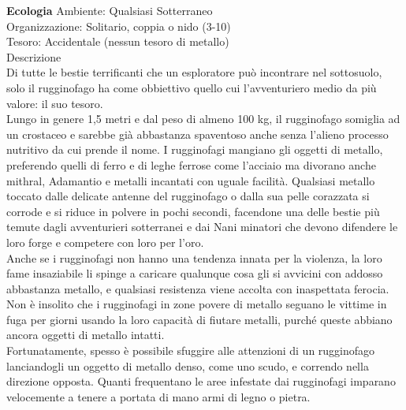 \begin{multicols}{2}
\textbf{Ecologia}
Ambiente: Qualsiasi Sotterraneo\\
Organizzazione: Solitario, coppia o nido (3-10)\\
Tesoro: Accidentale (nessun tesoro di metallo)\\
Descrizione\\
Di tutte le bestie terrificanti che un esploratore può incontrare nel sottosuolo, solo il rugginofago ha come obbiettivo quello cui l'avventuriero medio da più valore: il suo tesoro.\\
Lungo in genere 1,5 metri e dal peso di almeno 100 kg, il rugginofago somiglia ad un crostaceo e sarebbe già abbastanza spaventoso anche senza l'alieno processo nutritivo da cui prende il nome. I rugginofagi mangiano gli oggetti di metallo, preferendo quelli di ferro e di leghe ferrose come l'acciaio ma divorano anche mithral, Adamantio e metalli incantati con uguale facilità. Qualsiasi metallo toccato dalle delicate antenne del rugginofago o dalla sua pelle corazzata si corrode e si riduce in polvere in pochi secondi, facendone una delle bestie più temute dagli avventurieri sotterranei e dai Nani minatori che devono difendere le loro forge e competere con loro per l'oro.\\
Anche se i rugginofagi non hanno una tendenza innata per la violenza, la loro fame insaziabile li spinge a caricare qualunque cosa gli si avvicini con addosso abbastanza metallo, e qualsiasi resistenza viene accolta con inaspettata ferocia. Non è insolito che i rugginofagi in zone povere di metallo seguano le vittime in fuga per giorni usando la loro capacità di fiutare metalli, purché queste abbiano ancora oggetti di metallo intatti.\\
Fortunatamente, spesso è possibile sfuggire alle attenzioni di un rugginofago lanciandogli un oggetto di metallo denso, come uno scudo, e correndo nella direzione opposta. Quanti frequentano le aree infestate dai rugginofagi imparano velocemente a tenere a portata di mano armi di legno o pietra.\\


\end{multicols}
